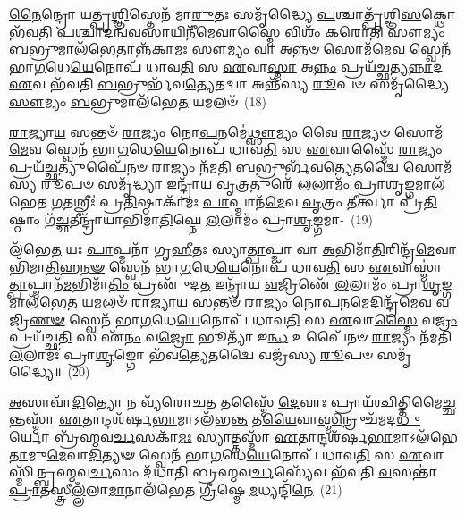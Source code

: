 \-\ul{𑌨𑍈}\-𑌨𑍍𑌦𑍍𑌰𑍋 𑌯𑌤𑍍𑌪𑍃\-\ul{𑌶𑍍𑌞𑌿}\-𑌸𑍍𑌤𑍇𑌨᳴ 𑌮𑌾\-\ul{𑌰𑍁}\-𑌤𑌃 𑌸𑌮𑍃᳴𑌦𑍍𑌧𑍍𑌯𑍈 \ul{𑌪}\-𑌶𑍍𑌚𑌾𑌤𑍍𑌪𑍃᳴𑌶𑍍𑌞𑌿\-\ul{𑌸}\-𑌕𑍍𑌥𑍋 𑌭᳴𑌵𑌤𑌿 𑌪𑌶𑍍𑌚𑌾𑌦𑌨𑍍𑌵𑌵\-\ul{𑌸𑌾}\-𑌯𑌿𑌨𑍀᳴\-\ul{𑌮𑍇}\-𑌵𑌾\-\ul{𑌸𑍍𑌮𑍈} 𑌵𑌿𑌶𑌂᳴ 𑌕𑌰𑍋𑌤𑌿 \ul{𑌸𑍗}\-𑌮𑍍𑌯𑌂 \ul{𑌬}\-𑌭𑍍𑌰𑍁𑌮𑌾𑌲᳴\-\ul{𑌭𑍇}\-𑌤𑌾𑌨𑍍𑌨᳴𑌕𑌾𑌮𑌃 \ul{𑌸𑍗}\-𑌮𑍍𑌯𑌂 𑌵𑌾 𑌅\-\ul{𑌨𑍍𑌨}\-\-\ul{𑍞} 𑌸𑍋𑌮᳴\-\ul{𑌮𑍇}\-𑌵 𑌸𑍍𑌵𑍇𑌨᳴ 𑌭𑌾\-\ul{𑌗}\-𑌧𑍇\-\ul{𑌯𑍇}\-𑌨𑍋𑌪᳴ 𑌧𑌾𑌵\-\ul{𑌤𑌿} 𑌸 \ul{𑌏}\-𑌵𑌾\-\ul{𑌸𑍍𑌮𑌾} 𑌅\-\ul{𑌨𑍍𑌨𑌂} 𑌪𑍍𑌰𑌯᳴𑌚𑍍𑌛𑌤𑍍𑌯\-\ul{𑌨𑍍𑌨𑌾}\-𑌦 \ul{𑌏}\-𑌵 𑌭᳴𑌵𑌤𑌿 \ul{𑌬}\-𑌭𑍍𑌰𑍁𑌰𑍍𑌭᳴𑌵\-\ul{𑌤𑍍𑌯𑍇}\-𑌤𑌦𑍍𑌵𑌾 𑌅𑌨𑍍𑌨᳴𑌸𑍍𑌯 \ul{𑌰𑍂}\-𑌪𑍞 𑌸𑌮𑍃᳴𑌦𑍍𑌧𑍍𑌯𑍈 \ul{𑌸𑍗}\-𑌮𑍍𑌯𑌂 \ul{𑌬}\-𑌭𑍍𑌰𑍁𑌮𑌾\-𑌲᳴𑌭𑍇\-\ul{𑌤} 𑌯𑌮𑌲𑍞᳴~(18)

\-\ul{𑌰𑌾}\-𑌜𑍍𑌯𑌾\-\ul{𑌯} 𑌸𑌨𑍍𑌤𑍞᳴ \ul{𑌰𑌾}\-𑌜𑍍𑌯𑌂 𑌨𑍋\-\ul{𑌪}\-𑌨𑌮𑍇॑\-\ul{𑌥𑍍𑌸𑍗}\-𑌮𑍍𑌯𑌂 𑌵𑍈 \ul{𑌰𑌾}\-𑌜𑍍𑌯𑍞 𑌸𑍋𑌮᳴\-\ul{𑌮𑍇}\-𑌵 𑌸𑍍𑌵𑍇𑌨᳴ 𑌭𑌾\-\ul{𑌗}\-𑌧𑍇\-\ul{𑌯𑍇}\-𑌨𑍋𑌪᳴ 𑌧𑌾𑌵\-\ul{𑌤𑌿} 𑌸 \ul{𑌏}\-𑌵𑌾𑌸𑍍𑌮𑍈᳴ \ul{𑌰𑌾}\-𑌜𑍍𑌯𑌂 𑌪𑍍𑌰𑌯᳴\-\ul{𑌚𑍍𑌛}\-𑌤𑍍𑌯𑍁𑌪𑍈᳴𑌨𑍞 \ul{𑌰𑌾}\-𑌜𑍍𑌯𑌂 𑌨᳴𑌮𑌤𑌿 \ul{𑌬}\-𑌭𑍍𑌰𑍁𑌰𑍍𑌭᳴𑌵\-\ul{𑌤𑍍𑌯𑍇}\-𑌤𑌦𑍍𑌵𑍈 𑌸𑍋𑌮᳴𑌸𑍍𑌯 \ul{𑌰𑍂}\-𑌪𑍞 𑌸𑌮𑍃᳴\-\ul{𑌦𑍍𑌧𑍍𑌯𑌾} 𑌇𑌨𑍍𑌦𑍍𑌰𑌾᳴𑌯 𑌵𑍃\-\ul{𑌤𑍍𑌰}\-𑌤𑍁𑌰𑍇᳴ \ul{𑌲}\-𑌲𑌾𑌮𑌂᳴ 𑌪𑍍𑌰𑌾\-\ul{𑌶𑍃}\-𑌙𑍍𑌗𑌮𑌾𑌲᳴𑌭𑍇𑌤 \ul{𑌗}\-𑌤𑌶𑍍𑌰𑍀𑌃॑ 𑌪𑍍𑌰\-\ul{𑌤𑌿}\-𑌷𑍍𑌠𑌾𑌕𑌾᳴𑌮𑌃 \ul{𑌪𑌾}\-𑌪𑍍𑌮𑌾𑌨᳴\-\ul{𑌮𑍇}\-𑌵 \ul{𑌵𑍃}\-𑌤𑍍𑌰𑌂 \ul{𑌤𑍀}\-𑌰𑍍𑌤𑍍𑌵𑌾 𑌪𑍍𑌰᳴\-\ul{𑌤𑌿}\-𑌷𑍍𑌠𑌾𑌂 𑌗᳴\-\ul{𑌚𑍍𑌛}\-𑌤𑍀𑌨𑍍𑌦𑍍𑌰𑌾᳴𑌯𑌾𑌭𑌿𑌮𑌾\-\ul{𑌤𑌿}\-𑌘𑍍𑌨𑍇 \ul{𑌲}\-𑌲𑌾𑌮𑌂᳴ 𑌪𑍍𑌰𑌾\-\ul{𑌶𑍃}\-𑌙𑍍𑌗𑌮𑌾-~(19)

\-𑌲᳴𑌭𑍇\-\ul{𑌤} 𑌯𑌃 \ul{𑌪𑌾}\-𑌪𑍍𑌮𑌨𑌾᳴ 𑌗𑍃\-\ul{𑌹𑍀}\-𑌤𑌃 𑌸𑍍𑌯𑌾\-\ul{𑌤𑍍𑌪𑌾}\-𑌪𑍍𑌮𑌾 𑌵𑌾 \ul{𑌅}\-𑌭𑌿𑌮𑌾᳴\-\ul{𑌤𑌿}\-𑌰𑌿𑌨𑍍𑌦𑍍𑌰᳴\-\ul{𑌮𑍇}\-𑌵𑌾𑌭𑌿᳴𑌮𑌾\-\ul{𑌤𑌿}\-𑌹\-\ul{𑌨}\-\-\ul{𑍟} 𑌸𑍍𑌵𑍇𑌨᳴ 𑌭𑌾\-\ul{𑌗}\-𑌧𑍇\-\ul{𑌯𑍇}\-𑌨𑍋𑌪᳴ 𑌧𑌾𑌵\-\ul{𑌤𑌿} 𑌸 \ul{𑌏}\-𑌵𑌾𑌸𑍍𑌮𑌾॑\-\ul{𑌤𑍍𑌪𑌾}\-𑌪𑍍𑌮𑌾𑌨᳴\-\ul{𑌮}\-𑌭𑌿𑌮𑌾᳴\-\ul{𑌤𑌿𑌂} 𑌪𑍍𑌰𑌣𑍁᳴𑌦\-\ul{𑌤} 𑌇𑌨𑍍𑌦𑍍𑌰𑌾᳴𑌯 \ul{𑌵}\-𑌜𑍍𑌰𑌿𑌣𑍇᳴ \ul{𑌲}\-𑌲𑌾𑌮𑌂᳴ 𑌪𑍍𑌰𑌾\-\ul{𑌶𑍃}\-𑌙𑍍𑌗𑌮𑌾\-𑌲᳴𑌭𑍇\-\ul{𑌤} 𑌯𑌮𑌲𑍞᳴ \ul{𑌰𑌾}\-𑌜𑍍𑌯𑌾\-\ul{𑌯} 𑌸𑌨𑍍𑌤𑍞᳴ \ul{𑌰𑌾}\-𑌜𑍍𑌯𑌂 𑌨𑍋\-\ul{𑌪}\-𑌨\-\ul{𑌮𑍇}\-𑌦𑌿𑌨𑍍𑌦𑍍𑌰᳴\-\ul{𑌮𑍇}\-𑌵 \ul{𑌵}\-𑌜𑍍𑌰𑌿\-\ul{𑌣}\-\-\ul{𑍟} 𑌸𑍍𑌵𑍇𑌨᳴ 𑌭𑌾\-\ul{𑌗}\-𑌧𑍇\-\ul{𑌯𑍇}\-𑌨𑍋𑌪᳴ 𑌧𑌾𑌵\-\ul{𑌤𑌿} 𑌸 \ul{𑌏}\-𑌵𑌾\-\ul{𑌸𑍍𑌮𑍈} 𑌵\-\ul{𑌜𑍍𑌰𑌂} 𑌪𑍍𑌰𑌯᳴𑌚𑍍𑌛\-\ul{𑌤𑌿} 𑌸 𑌏᳴\-\ul{𑌨𑌂} 𑌵\-\ul{𑌜𑍍𑌰𑍋} 𑌭𑍂𑌤𑍍𑌯𑌾᳴ 𑌇\-\ul{𑌨𑍍𑌧} 𑌉𑌪𑍈᳴𑌨𑍞 \ul{𑌰𑌾}\-𑌜𑍍𑌯𑌂 𑌨᳴𑌮𑌤𑌿 \ul{𑌲}\-𑌲𑌾𑌮𑌃᳴ 𑌪𑍍𑌰𑌾\-\ul{𑌶𑍃}\-𑌙𑍍𑌗𑍋 𑌭᳴𑌵\-\ul{𑌤𑍍𑌯𑍇}\-𑌤𑌦𑍍𑌵𑍈 𑌵𑌜𑍍𑌰᳴𑌸𑍍𑌯 \ul{𑌰𑍂}\-𑌪𑍞 𑌸𑌮𑍃᳴𑌦𑍍𑌧𑍍𑌯𑍈॥~(20)

{\anuvakamend[{\-\ul{𑌸}\-\-\ul{𑌙𑍍𑌗𑍍𑌰𑌾}\-𑌮𑍇 𑌤𑍇𑌨𑌾𑌲᳴𑌮𑌭𑌿𑌮𑌾\-\ul{𑌤𑌿}\-𑌘𑍍𑌨𑍇 \ul{𑌲}\-𑌲𑌾𑌮𑌂᳴ 𑌪𑍍𑌰𑌾\-\ul{𑌶𑍃}\-𑌙𑍍𑌗𑌮𑍈\-\ul{𑌨𑌂} 𑌪𑌞𑍍𑌚᳴𑌦𑌶 𑌚।3।}]}

\-\ul{𑌅}\-𑌸𑌾𑌵𑌾᳴\-\ul{𑌦𑌿}\-𑌤𑍍𑌯𑍋 𑌨 𑌵𑍍𑌯᳴𑌰𑍋𑌚\-\ul{𑌤} 𑌤𑌸𑍍𑌮𑍈᳴ \ul{𑌦𑍇}\-𑌵𑌾𑌃 𑌪𑍍𑌰𑌾𑌯᳴𑌶𑍍𑌚𑌿𑌤𑍍𑌤𑌿\-𑌮𑍈\-\ul{𑌚𑍍𑌛}\-𑌨𑍍𑌤𑌸𑍍𑌮𑌾᳴ \ul{𑌏}\-𑌤𑌾𑌨𑍍𑌦𑌶᳴𑌰𑍍\mbox{}𑌷\-\ul{𑌭𑌾}\-𑌮𑌾\-𑌽𑌲᳴𑌭\-\ul{𑌨𑍍𑌤} 𑌤\-\ul{𑌯𑍈}\-𑌵𑌾\-\ul{𑌸𑍍𑌮𑌿}\-𑌨𑍍𑌰𑍁𑌚᳴𑌮𑌦\-\ul{𑌧𑍁}\-𑌰𑍍𑌯𑍋 𑌬𑍍𑌰᳴𑌹𑍍𑌮𑌵\-\ul{𑌰𑍍𑌚}\-𑌸𑌕𑌾᳴\-\ul{𑌮𑌃} 𑌸𑍍𑌯𑌾𑌤𑍍𑌤𑌸𑍍𑌮𑌾᳴ \ul{𑌏}\-𑌤𑌾𑌨𑍍𑌦𑌶᳴𑌰𑍍\mbox{}𑌷\-\ul{𑌭𑌾}\-𑌮𑌾\-𑌽𑌲᳴𑌭𑍇\-\ul{𑌤𑌾}\-𑌮𑍁\-\ul{𑌮𑍇}\-𑌵𑌾\-\-\ul{𑌦𑌿}\-𑌤𑍍𑌯𑍟 𑌸𑍍𑌵𑍇𑌨᳴ 𑌭𑌾\-\ul{𑌗}\-𑌧𑍇\-\ul{𑌯𑍇}\-𑌨𑍋𑌪᳴ 𑌧𑌾𑌵\-\ul{𑌤𑌿} 𑌸 \ul{𑌏}\-𑌵𑌾𑌸𑍍𑌮𑌿᳴𑌨𑍍𑌬𑍍𑌰𑌹𑍍𑌮\-𑌵\-\ul{𑌰𑍍𑌚}\-𑌸𑌂 𑌦᳴𑌧𑌾𑌤𑌿 𑌬𑍍𑌰𑌹𑍍𑌮𑌵\-\ul{𑌰𑍍𑌚}\-𑌸𑍍𑌯𑍇᳴𑌵 𑌭᳴𑌵𑌤𑌿 \ul{𑌵}\-𑌸𑌨𑍍𑌤𑌾॑ \ul{𑌪𑍍𑌰𑌾}\-𑌤𑌸𑍍𑌤𑍍𑌰𑍀\-\ul{𑌲𑍍𑌲𑌁}\-𑌲𑌾\-\ul{𑌮𑌾}\-𑌨𑌾\-𑌲᳴𑌭𑍇𑌤 \ul{𑌗𑍍𑌰𑍀}\-𑌷𑍍𑌮𑍇 \ul{𑌮}\-𑌧𑍍𑌯𑌨𑍍𑌦𑌿᳴\-\ul{𑌨𑍇}\-~(21)

